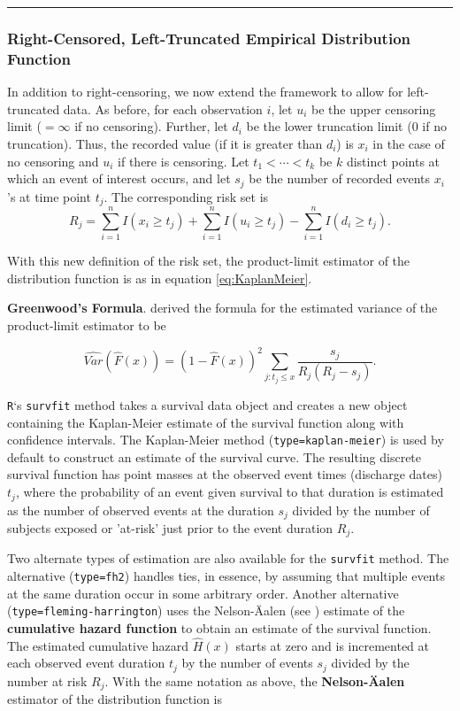 \documentclass[]{book}
\theoremstyle{definition}
\theoremstyle{definition}
\theoremstyle{definition}
\theoremstyle{remark}
\begin{document}
\begin{center}\rule{0.5\linewidth}{\linethickness}\end{center}

\subsubsection{Right-Censored, Left-Truncated Empirical Distribution
Function}\label{right-censored-left-truncated-empirical-distribution-function}

In addition to right-censoring, we now extend the framework to allow for
left-truncated data. As before, for each observation \(i\), let \(u_i\)
be the upper censoring limit (\(=\infty\) if no censoring). Further, let
\(d_i\) be the lower truncation limit (0 if no truncation). Thus, the
recorded value (if it is greater than \(d_i\)) is \(x_i\) in the case of
no censoring and \(u_i\) if there is censoring. Let
\(t_{1} <\cdots< t_{k}\) be \(k\) distinct points at which an event of
interest occurs, and let \(s_j\) be the number of recorded events
\(x_i\)'s at time point \(t_{j}\). The corresponding risk set is
\[R_j = \sum_{i=1}^n I(x_i \geq t_{j}) + \sum_{i=1}^n I(u_i \geq t_{j}) - \sum_{i=1}^n I(d_i \geq t_{j}).\]

With this new definition of the risk set, the product-limit estimator of
the distribution function is as in equation \eqref{eq:KaplanMeier}.

\textbf{Greenwood's Formula}. \citep{greenwood1926} derived the formula
for the estimated variance of the product-limit estimator to be

\[\widehat{Var}(\hat{F}(x)) = (1-\hat{F}(x))^{2} \sum _{j:t_{j} \leq x} \dfrac{s_j}{R_{j}(R_{j}-s_j)}.\]

\texttt{R}`s \texttt{survfit} method takes a survival data object and
creates a new object containing the Kaplan-Meier estimate of the
survival function along with confidence intervals. The Kaplan-Meier
method (\texttt{type=\textquotesingle{}kaplan-meier\textquotesingle{}})
is used by default to construct an estimate of the survival curve. The
resulting discrete survival function has point masses at the observed
event times (discharge dates) \(t_j\), where the probability of an event
given survival to that duration is estimated as the number of observed
events at the duration \(s_j\) divided by the number of subjects exposed
or 'at-risk' just prior to the event duration \(R_j\).

Two alternate types of estimation are also available for the
\texttt{survfit} method. The alternative
(\texttt{type=\textquotesingle{}fh2\textquotesingle{}}) handles ties, in
essence, by assuming that multiple events at the same duration occur in
some arbitrary order. Another alternative
(\texttt{type=\textquotesingle{}fleming-harrington\textquotesingle{}})
uses the Nelson-Äalen (see \citep{aalen1978}) estimate of the
\textbf{cumulative hazard function} to obtain an estimate of the
survival function. The estimated cumulative hazard \(\hat{H}(x)\) starts
at zero and is incremented at each observed event duration \(t_j\) by
the number of events \(s_j\) divided by the number at risk \(R_j\). With
the same notation as above, the \textbf{Nelson-Äalen} estimator of the
distribution function is
\end{document}
